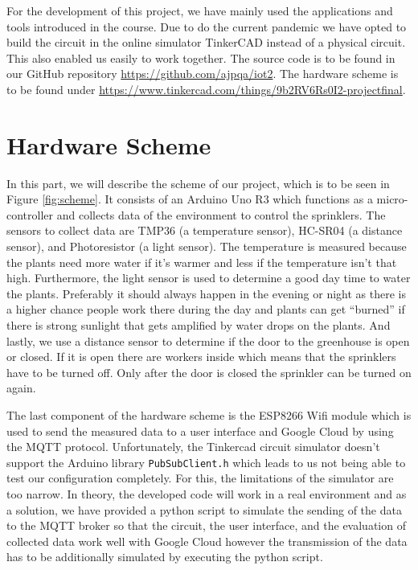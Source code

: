 \documentclass{article}
\begin{document}
For the development of this project, we have mainly used the applications and tools introduced in the course. Due to do the current pandemic we have opted to build the circuit in the online simulator TinkerCAD instead of a physical circuit. This also enabled us easily to work together. The source code is to be found in our GitHub repository \url{https://github.com/ajpqa/iot2}. The hardware scheme is to be found under \url{https://www.tinkercad.com/things/9b2RV6Rs0I2-projectfinal}.
\section{Hardware Scheme}
In this part, we will describe the scheme of our project, which is to be seen in Figure \ref{fig:scheme}. It consists of an Arduino Uno R3 which functions as a micro-controller and collects data of the environment to control the sprinklers. The sensors to collect data are TMP36 (a temperature sensor), HC-SR04 (a distance sensor), and Photoresistor (a light sensor). The temperature is measured because the plants need more water if it's warmer and less if the temperature isn't that high. Furthermore, the light sensor is used to determine a good day time to water the plants. Preferably it should always happen in the evening or night as there is a higher chance people work there during the day and plants can get \enquote{burned} if there is strong sunlight that gets amplified by water drops on the plants. And lastly, we use a distance sensor to determine if the door to the greenhouse is open or closed. If it is open there are workers inside which means that the sprinklers have to be turned off. Only after the door is closed the sprinkler can be turned on again.\par
The last component of the hardware scheme is the ESP8266 Wifi module which is used to send the measured data to a user interface and Google Cloud by using the MQTT protocol. Unfortunately, the Tinkercad circuit simulator doesn't support the Arduino library \texttt{PubSubClient.h} which leads to us not being able to test our configuration completely. For this, the limitations of the simulator are too narrow. In theory, the developed code will work in a real environment and as a solution, we have provided a python script to simulate the sending of the data to the MQTT broker so that the circuit, the user interface, and the evaluation of collected data work well with Google Cloud however the transmission of the data has to be additionally simulated by executing the python script.
\end{document}
